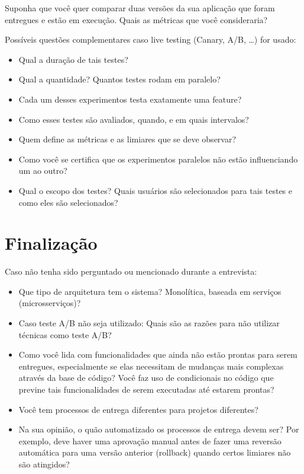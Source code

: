 Suponha que você quer comparar duas versões da sua aplicação que foram entregues e estão em execução. Quais as métricas que você consideraria?

Possíveis questões complementares caso live testing (Canary, A/B, …) for usado:
\begin{itemize}
	\item Qual a duração de tais testes?
	\item Qual a quantidade? Quantos testes rodam em paralelo?
	\item Cada um desses experimentos testa exatamente uma feature?
	\item Como esses testes são avaliados, quando, e em quais intervalos?
	\item Quem define as métricas e as limiares que se deve observar?
	\item Como você se certifica que os experimentos paralelos não estão influenciando um ao outro?
	\item Qual o escopo dos testes? Quais usuários são selecionados para tais testes e como eles são selecionados?
\end{itemize}


\section{Finalização}
Caso não tenha sido perguntado ou mencionado durante a entrevista:
\begin{itemize}
	\item Que tipo de arquitetura tem o sistema? Monolítica, baseada em serviços (microsserviços)?
	\item Caso teste A/B não seja utilizado: Quais são as razões para não utilizar técnicas como teste A/B?
	\item Como você lida com funcionalidades que ainda não estão prontas para serem entregues, especialmente se elas necessitam de mudanças mais complexas através da base de código? Você faz uso de condicionais no código que previne tais funcionalidades de serem executadas até estarem prontas?
	\item Você tem processos de entrega diferentes para projetos diferentes?
	\item Na sua opinião, o quão automatizado os processos de entrega devem ser? Por exemplo, deve haver uma aprovação manual antes de fazer uma reversão automática para uma versão anterior (rollback) quando certos limiares não são atingidos?
\end{itemize}

